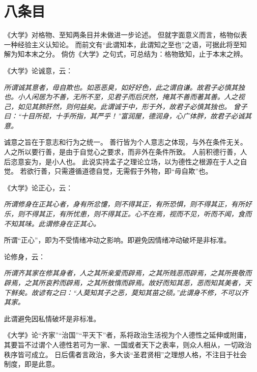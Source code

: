 \documentclass[11pt]{article}
\begin{document}
\section{八条目}
《大学》对格物、至知两条目并未做进一步论述。
但就字面意义而言，格物似表一种经验主义认知论。
而前文有“此谓知本，此谓知之至也”之语，可据此将至知解为知本末之分。
倘仿《大学》之句式，可总结为：格物致知，止于本末之辨。

\par

《大学》论诚意，云：

\textit{所谓诚其意者，毋自欺也。如恶恶臭，如好好色，此之谓自谦。故君子必慎其独也。小人闲居为不善，无所不至，见君子而后厌然，掩其不善而著其善。人之视己，如见其肺肝然，则何益矣。此谓诚于中，形于外，故君子必慎其独也。 曾子曰：“十目所视，十手所指，其严乎！”富润屋，德润身，心广体胖，故君子必诚其意。}

诚意之旨在于意志和行为之统一。
善行皆为个人意志之体现，与外在条件无关。
人之所以要行善，是由于自觉心之要求，而非外在条件所致。
人前积德行善，人后恣意妄为，是小人也。
此说实持孟子之理论立场，以为德性之根源在于人之自觉。
若欲行善，只需遵循道德自觉，无需假于外物，即“毋自欺”也。

\par

《大学》论正心，云：
  
\textit{所谓修身在正其心者，身有所忿懥，则不得其正，有所恐惧，则不得其正，有所好乐，则不得其正，有所忧患，则不得其正。心不在焉，视而不见，听而不闻，食而不知其味。此谓修身在正其心。}

所谓“正心”，即为不受情绪冲动之影响。即避免因情绪冲动破坏是非标准。

\par

论修身，云：
  
\textit{所谓齐其家在修其身者，人之其所亲爱而辟焉，之其所贱恶而辟焉，之其所畏敬而辟焉，之其所哀矜而辟焉，之其所敖惰而辟焉。故好而知其恶，恶而知其美者，天下鲜矣。故谚有之曰：“人莫知其子之恶，莫知其苗之硕。”此谓身不修，不可以齐其家。}
  
此谓避免因私情破坏是非标准。

\par

《大学》论“齐家”“治国”“平天下”者，系将政治生活视为个人德性之延伸或附庸，其要旨不过谓个人德性若可为一家、一国或者天下之表率，则众人相从，一切政治秩序皆可成立。
日后儒者言政治，多大谈“圣君贤相”之理想人格，不注目于社会制度，即是此意。 
\end{document}
